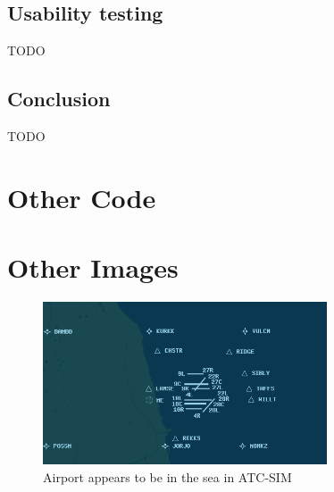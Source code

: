 \documentclass{article}
\begin{document}
\subsection{Usability testing}
TODO


\subsection{Conclusion}
TODO


\clearpage

\printbibliography
{}

\printnoidxglossaries

\begin{appendices}
\section{Other Code}\label{appendix:otherfunctions}


\section{Other Images}\label{appendix:otherimages}
\begin{figure}[H]
\centering
\includegraphics[width=0.75\textwidth]{existing_solutions/airportinseaatcsim.png}
\caption{\label{fig:airportinseaatcsim}Airport appears to be in the sea in ATC-SIM}
\end{figure}
\end{appendices}
\end{document}
